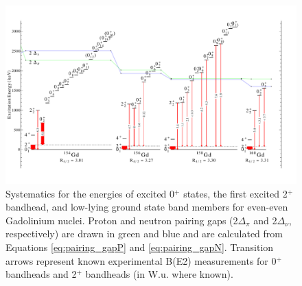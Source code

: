 
\begin{landscape}
\begin{figure}[ht] 
\begin{center}
\includegraphics[height=0.8\textheight]{figures/SciDraw_GdSystematics.pdf}
\caption{Systematics for the energies of excited 0$^+$ states, the first excited 2$^+$ bandhead, and low-lying ground state band members for even-even Gadolinium nuclei. Proton and neutron pairing gaps (2$\Delta_\pi$ and 2$\Delta_\nu$, respectively) are drawn in green and blue and are calculated from Equations \ref{eq:pairing_gapP} and \ref{eq:pairing_gapN}. Transition arrows represent known experimental B(E2) measurements for 0$^+$ bandheads and 2$^+$ bandheads (in W.u. where known). \label{fig:GdSystematics}}
\end{center}
\end{figure}
\end{landscape}


